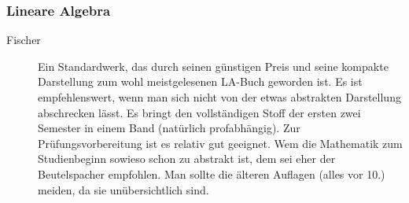 \subsubsection*{Lineare Algebra}
\begin{description}
\item[Fischer]{
Ein Standardwerk, das durch seinen günstigen Preis und seine kompakte
Darstellung zum wohl meistgelesenen LA-Buch geworden ist. Es ist
empfehlenswert, wenn man sich nicht von der etwas abstrakten Darstellung
abschrecken lässt. Es bringt den vollständigen Stoff der ersten zwei
Semester in einem Band (natürlich profabhängig). Zur
Prüfungsvorbereitung
ist es relativ gut geeignet. Wem die Mathematik zum Studienbeginn
sowieso
schon zu abstrakt ist, dem sei eher der Beutelspacher empfohlen.
Man sollte die älteren Auflagen (alles vor 10.) meiden, da sie
unübersichtlich sind.}






\end{description}
